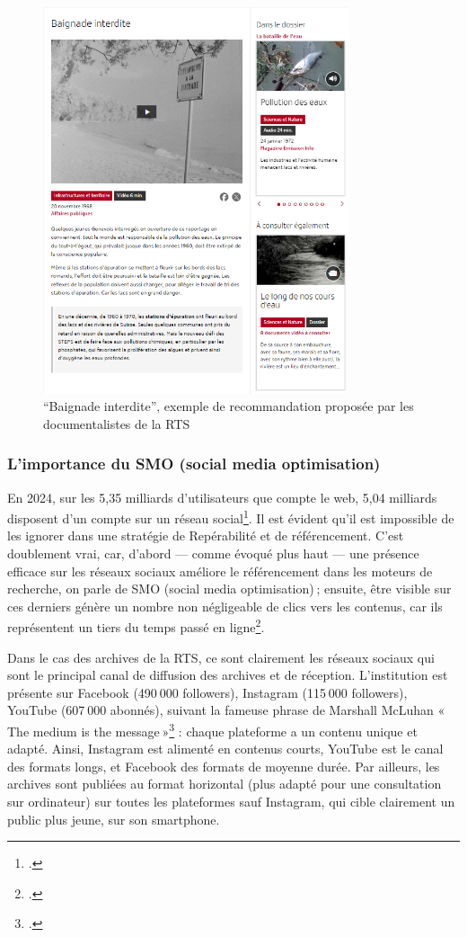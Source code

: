 \begin{figure}[h!]
	\centering
	\includegraphics[width=0.8\textwidth]{images/image8.png}
	\caption{\enquote{Baignade interdite}, exemple de recommandation proposée par les documentalistes de la RTS}
	\label{fig:image8}
\end{figure}


\subsubsection{L'importance du SMO (social media optimisation)}


En 2024, sur les 5,35 milliards d’utilisateurs que compte le web, 5,04 milliards disposent d’un compte sur un réseau social\footcite{zotero-229}. Il est évident qu’il est impossible de les ignorer dans une stratégie de Repérabilité et de référencement. C’est doublement vrai, car, d’abord — comme évoqué plus haut — une présence efficace sur les réseaux sociaux améliore le référencement dans les moteurs de recherche, on parle de SMO (social media optimisation) ; ensuite, être visible sur ces derniers génère un nombre non négligeable de clics vers les contenus, car ils représentent un tiers du temps passé en ligne\footcite{zotero-227}.

Dans le cas des archives de la RTS, ce sont clairement les réseaux sociaux qui sont le principal canal de diffusion des archives et de réception. L’institution est présente sur Facebook (490 000 followers), Instagram (115 000 followers), YouTube (607 000 abonnés), suivant la fameuse phrase de Marshall McLuhan « The medium is the message »\footcite{zotero-226} : chaque plateforme a un contenu unique et adapté. Ainsi, Instagram est alimenté en contenus courts, YouTube est le canal des formats longs, et Facebook des formats de moyenne durée. Par ailleurs, les archives sont publiées au format horizontal (plus adapté pour une consultation sur ordinateur) sur toutes les plateformes sauf Instagram, qui cible clairement un public plus jeune, sur son smartphone.


